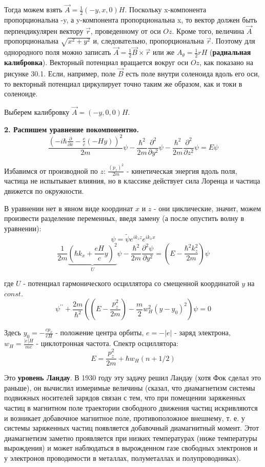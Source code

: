 \par Тогда можем взять $\vec{A} = \frac{1}{2}(-y, x, 0)H$. Поскольку x-компонента пропорциональна -y, а y-компонента пропорциональна x, то вектор  должен быть перпендикулярен вектору $\vec{r}$, проведенному от оси $Oz$. Кроме того, величина $\vec{A}$ пропорциональна $\sqrt{x^2+y^2}$ и, следовательно, пропорциональна $\vec{r}$. Поэтому для однородного поля можно записать $\vec{A}= \frac{1}{2} \vec{B} \times \vec{r}$ или же $A_{\theta}= \frac{1}{2} rH$ (\textbf{радиальная калибровка}). Векторный потенциал  вращается вокруг оси $Oz$, как показано на рисунке 30.1. Если, например, поле $\vec{B}$ есть поле внутри соленоида вдоль его оси, то векторный потенциал циркулирует точно таким же образом, как и токи в соленоиде.
\par Выберем калибровку $\vec{A} = (-y, 0, 0)H$.
\par \textbf{2. Распишем уравнение покомпонентно.}
$$\frac{\left(-i\hbar \frac{\partial}{\partial x} - \frac{e}{c}(-Hy) \right)^2}{2m}\psi - \frac{\hbar^2}{2m} \frac{\partial^2}{\partial y^2}\psi - \frac{\hbar^2}{2m} \frac{\partial^2}{\partial z^2}\psi =E \psi$$
\par Избавимся от производной по $z$: $\frac{(p_z)^2}{2m}$ - кинетическая энергия вдоль поля, частица не испытывает влияния, но в классике действует сила Лоренца и частица движется по окружности.
\par В уравнении нет в явном виде координат $x$ и $z$ - они циклические, значит, можем произвести разделение переменных, введя замену (а после опустить волну в уравнении):
$$ \psi = \widetilde{\psi} e^{i k_z z}e^{i k_x x} $$
$$\frac{1}{2m} \underbrace{\left(\hbar k_x + \frac{eH}{c} y \right)^2}_{U} \psi - \frac{\hbar^2}{2m} \frac{\partial^2 \psi}{\partial y^2} = \left(E - \frac{\hbar^2 k^2_z}{2m} \right) \psi$$
\par где $U$ - потенциал гармонического осциллятора со смещенной координатой $y$ на $const$.
$$\psi^{\prime \prime} + \frac{2m}{\hbar^2} \left(\left(E- \frac{p^2_z}{2m} \right) - \frac{m}{2} w^2_H (y-y_0)^2 \right) \psi = 0$$
\par Здесь $y_0 = -\frac{c p_x}{eH}$ - положение центра орбиты, $e=-|e|$ - заряд электрона, $w_H = \frac{|e|H}{mc}$ - циклотронная частота. Спектр осциллятора: 
$$E= \frac{p^2_z}{2m} +\hbar w_H (n+1/2)$$ 
\par Это \textbf{уровень Ландау}. В 1930 году эту задачу решил Ландау (хотя Фок сделал это раньше), он  вычислил измеримые величины (сказал, что диамагнетизм системы подвижных носителей зарядов связан с тем, что при помещении заряженных частиц в магнитном поле траектории свободного движения частиц искривляются и возникает добавочное магнитное поле, противоположное внешнему, т. е. у системы заряженных частиц появляется добавочный диамагнитный момент. Этот диамагнетизм заметно проявляется при низких температурах (ниже температуры вырождения) и может наблюдаться в вырожденном газе свободных электронов и у электронов проводимости в металлах, полуметаллах и полупроводниках). 
